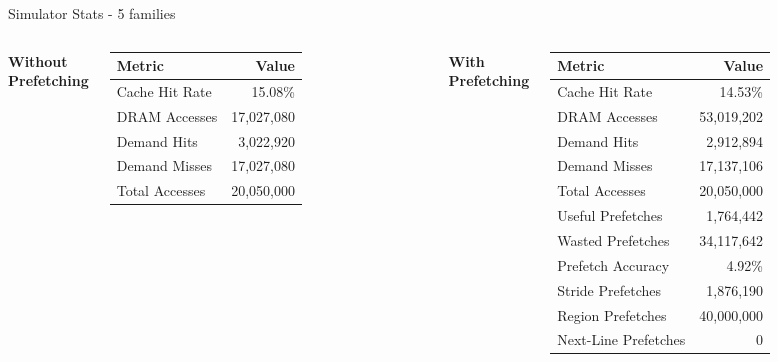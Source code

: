 \documentclass[Serif, 10pt, brown]{beamer}
\theoremstyle{example}
\theoremstyle{plain}
\begin{document}
\begin{frame}{Simulator Stats - 5 families}

\begin{columns}
    \centering
    \textbf{Without Prefetching}
    
    \vspace{2mm}
    
    {\scriptsize \begin{tabular}{|l|r|}
        \hline
        Metric & Value \\
        \hline
        Cache Hit Rate & 15.08\% \\
        DRAM Accesses & 17,027,080 \\
        Demand Hits & 3,022,920 \\
        Demand Misses & 17,027,080 \\
        Total Accesses & 20,050,000 \\
        \hline
    \end{tabular}}

    \centering
    \textbf{With Prefetching}
    
    \vspace{2mm}
    
    {\scriptsize \begin{tabular}{|l|r|}
        \hline
        Metric & Value \\
        \hline
        Cache Hit Rate & 14.53\% \\
        DRAM Accesses & 53,019,202 \\
        Demand Hits & 2,912,894 \\
        Demand Misses & 17,137,106 \\
        Total Accesses & 20,050,000 \\
        Useful Prefetches & 1,764,442 \\
        Wasted Prefetches & 34,117,642 \\
        Prefetch Accuracy & 4.92\% \\
        Stride Prefetches & 1,876,190 \\
        Region Prefetches & 40,000,000 \\
        Next-Line Prefetches & 0 \\
        \hline
    \end{tabular}}

\end{columns}

\vspace{3mm}

\centering
\small

\end{frame}
\end{document}
